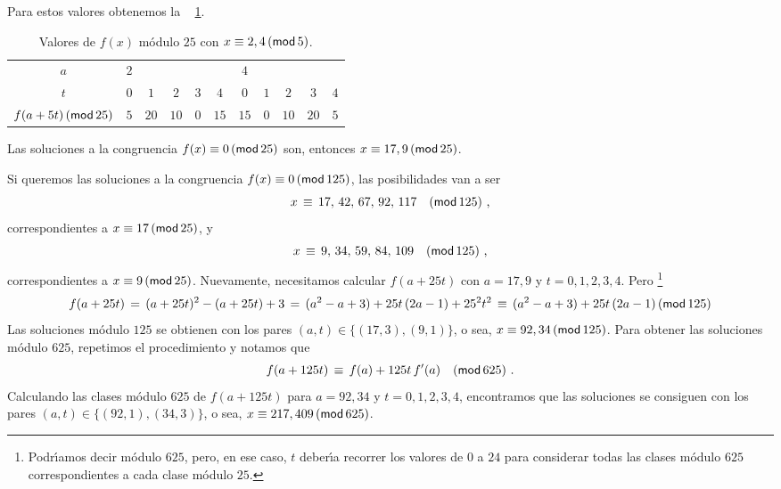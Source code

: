 \begin{ejemHensel}
	Para estos valores obtenemos la \tablename~%
	\ref{tab:hensel:cinco}.
	\begin{table}
		\centering
		\begin{tabular}{c|ccccc|ccccc}
			$a$ & $2$ & & & &
				& $4$ & & & & \\
			$t$ & $0$ & $1$ & $2$ & $3$ & $4$
				& $0$ & $1$ & $2$ & $3$ & $4$ \\
			$f(a+5t)\tmodulo[25]$ & $5$ & $20$ & $10$ & $0$ & $15$
				& $15$ & $0$ & $10$ & $20$ & $5$
		\end{tabular}
		\caption{
			Valores de $f(x)$ m\'odulo $25$ con
			$x\equiv 2,4\tmodulo[5]$.
		}\label{tab:hensel:cinco}
	\end{table}
	Las soluciones a la congruencia $f(x)\equiv 0\tmodulo[25]$
	son, entonces $x\equiv 17,9\tmodulo[25]$.

	Si queremos las soluciones a la congruencia
	$f(x)\equiv 0\tmodulo[125]$, las posibilidades van a ser
	\begin{displaymath}
		x\,\equiv\,17,\,42,\,67,\,92,\,117\modulo[125]
		\dispcomma
	\end{displaymath}
	correspondientes a $x\equiv 17\tmodulo[25]$, y
	\begin{displaymath}
		x\,\equiv\,9,\,34,\,59,\,84,\,109\modulo[125]
		\dispcomma
	\end{displaymath}
	correspondientes a $x\equiv 9\tmodulo[25]$.
	Nuevamente, necesitamos calcular $f(a+25t)$ con
	$a=17,9$ y $t=0,1,2,3,4$. Pero%
	\footnote{
		Podr\'{\i}amos decir m\'odulo $625$,
		pero, en ese caso, $t$ deber\'{\i}a recorrer
		los valores de $0$ a $24$ para considerar
		todas las clases m\'odulo $625$
		correspondientes a cada clase m\'odulo $25$.
	}
	\begin{displaymath}
		f(a+25t)\,=\,(a+25t)^2-(a+25t)+3\,=\,
			(a^2-a+3)+25t\,(2a-1)+25^2t^2\,\equiv\,
			(a^2-a+3)+25t\,(2a-1)\tmodulo[125]
	\end{displaymath}
	Las soluciones m\'odulo $125$ se obtienen con los pares
	$(a,t)\in\{(17,3),(9,1)\}$, o sea,
	$x\equiv 92,34\tmodulo[125]$.
	Para obtener las soluciones m\'odulo $625$, repetimos el
	procedimiento y notamos que
	\begin{displaymath}
		f(a+125t)\,\equiv\,f(a)+125t\,f'(a)\modulo[625]
		\dispstop
	\end{displaymath}
	Calculando las clases m\'odulo $625$ de $f(a+125t)$
	para $a=92,34$ y $t=0,1,2,3,4$, encontramos que las
	soluciones se consiguen con los pares
	$(a,t)\in\{(92,1),(34,3)\}$, o sea,
	$x\equiv 217,409\tmodulo[625]$.
\end{ejemHensel}

